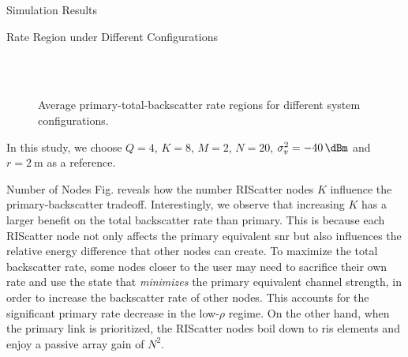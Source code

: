 \documentclass[journal]{IEEEtran}
\begin{document}
\begin{section}{Simulation Results}
	\begin{subsection}{Rate Region under Different Configurations}
		\begin{figure}[!t]
			\centering
			\\
			\\
			\caption{
				Average primary-total-backscatter rate regions for different system configurations.
			}
			\label{fg:region_config}
		\end{figure}
		In this study, we choose $Q=4$, $K=8$, $M=2$, $N=20$, $\sigma_v^2=\qty{-40}{\dBm}$ and $r=\qty{2}{\meter}$ as a reference.
		\begin{subsubsection}{Number of Nodes}
			Fig.  reveals how the number RIScatter nodes $K$ influence the primary-backscatter tradeoff.
			Interestingly, we observe that increasing $K$ has a larger benefit on the total backscatter rate than primary.
			This is because each RIScatter node not only affects the primary equivalent \gls{snr} but also influences the relative energy difference that other nodes can create.
			To maximize the total backscatter rate, some nodes closer to the user may need to sacrifice their own rate and use the state that \emph{minimizes} the primary equivalent channel strength, in order to increase the backscatter rate of other nodes.
			This accounts for the significant primary rate decrease in the low-$\rho$ regime.
			On the other hand, when the primary link is prioritized, the RIScatter nodes boil down to \gls{ris} elements and enjoy a passive array gain of $N^2$.
		\end{subsubsection}


\end{subsection}
\end{section}
\end{document}
